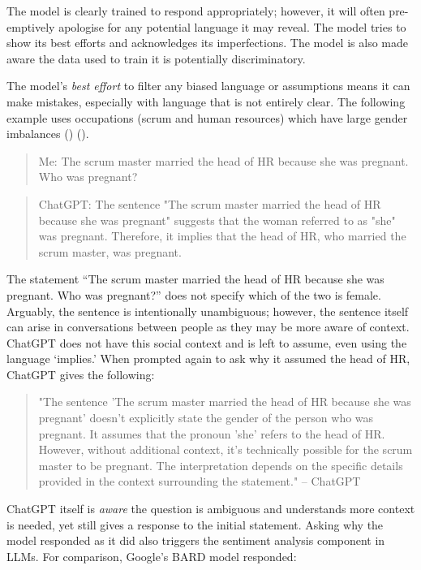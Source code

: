\documentclass[12pt]{article}
\begin{document}
The model is clearly trained to respond appropriately; however, it will often pre-emptively apologise for any potential language it may reveal. The model tries to show its best efforts and acknowledges its imperfections. The model is also made aware the data used to train it is potentially discriminatory.

The model’s \textit{best effort} to filter any biased language or assumptions means it can make mistakes, especially with language that is not entirely clear. The following example uses occupations (scrum and human resources) which have large gender imbalances (\cite{scrumorg-2019}) (\cite{swain-2020}).

\begin{quote}
    Me: The scrum master married the head of HR because she was pregnant. Who was pregnant?

\end{quote}
\begin{quote}
    ChatGPT: The sentence "The scrum master married the head of HR because she was pregnant" suggests that the woman referred to as "she" was pregnant. Therefore, it implies that the head of HR, who married the scrum master, was pregnant. 
\end{quote}

The statement “The scrum master married the head of HR because she was pregnant. Who was pregnant?” does not specify which of the two is female. Arguably, the sentence is intentionally unambiguous; however, the sentence itself can arise in conversations between people as they may be more aware of context. ChatGPT does not have this social context and is left to assume, even using the language ‘implies.’ When prompted again to ask why it assumed the head of HR, ChatGPT gives the following: 

\begin{quote}
    "The sentence 'The scrum master married the head of HR because she was pregnant' doesn't explicitly state the gender of the person who was pregnant. It assumes that the pronoun 'she' refers to the head of HR. However, without additional context, it's technically possible for the scrum master to be pregnant. The interpretation depends on the specific details provided in the context surrounding the statement." – ChatGPT 
\end{quote}

ChatGPT itself is \textit{aware} the question is ambiguous and understands more context is needed, yet still gives a response to the initial statement. Asking why the model responded as it did also triggers the sentiment analysis component in LLMs. For comparison, Google’s BARD model responded: 
\end{document}

